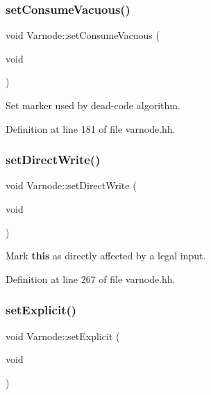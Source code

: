 \subsubsection{\texorpdfstring{setConsumeVacuous()}{setConsumeVacuous()}}
{\footnotesize\ttfamily void Varnode\+::set\+Consume\+Vacuous (\begin{DoxyParamCaption}\item[{void}]{ }\end{DoxyParamCaption})\hspace{0.3cm}{\ttfamily [inline]}}



Set marker used by dead-\/code algorithm. 



Definition at line 181 of file varnode.\+hh.

\mbox{\label{class_varnode_a2273f333dc5cba75c43461c04459dd28}} 
\subsubsection{\texorpdfstring{setDirectWrite()}{setDirectWrite()}}
{\footnotesize\ttfamily void Varnode\+::set\+Direct\+Write (\begin{DoxyParamCaption}\item[{void}]{ }\end{DoxyParamCaption})\hspace{0.3cm}{\ttfamily [inline]}}



Mark {\bfseries{this}} as directly affected by a legal input. 



Definition at line 267 of file varnode.\+hh.

\mbox{\label{class_varnode_a5eb9800b2395d8d920d576bfa2757eee}} 
\subsubsection{\texorpdfstring{setExplicit()}{setExplicit()}}
{\footnotesize\ttfamily void Varnode\+::set\+Explicit (\begin{DoxyParamCaption}\item[{void}]{ }\end{DoxyParamCaption})\hspace{0.3cm}{\ttfamily [inline]}}



